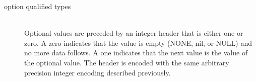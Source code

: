\begin{description}
  \item[option qualified types] \mbox{}\\
    Optional values are preceded by an integer header that is either one or
    zero. A zero indicates that the value is empty (NONE, nil, or NULL) and no
    more data follows. A one indicates that the next value is the value of the
    optional value. The header is encoded with the same arbitrary precision
    integer encoding described previously.
\end{description}%
